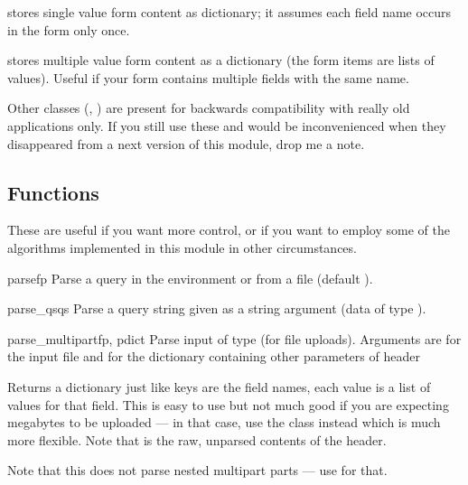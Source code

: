  stores single value form content as
dictionary; it assumes each field name occurs in the form only once.

 stores multiple value form content as a
dictionary (the form items are lists of values).  Useful if your form
contains multiple fields with the same name.

Other classes (, ) are
present for backwards compatibility with really old applications only.
If you still use these and would be inconvenienced when they
disappeared from a next version of this module, drop me a note.


\subsection{Functions}

These are useful if you want more control, or if you want to employ
some of the algorithms implemented in this module in other
circumstances.

\begin{funcdesc}{parse}{fp}
Parse a query in the environment or from a file (default
).
\end{funcdesc}

\begin{funcdesc}{parse_qs}{qs}
Parse a query string given as a string argument (data of type 
).
\end{funcdesc}

\begin{funcdesc}{parse_multipart}{fp, pdict}
Parse input of type  (for 
file uploads).  Arguments are  for the input file and
 for the dictionary containing other parameters of
 header

Returns a dictionary just like  keys are the
field names, each value is a list of values for that field.  This is
easy to use but not much good if you are expecting megabytes to be
uploaded --- in that case, use the  class instead
which is much more flexible.  Note that  is the
raw, unparsed contents of the  header.

Note that this does not parse nested multipart parts --- use
 for that.
\end{funcdesc}

